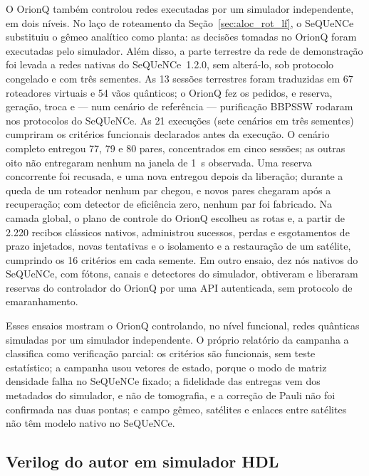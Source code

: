 \documentclass[12pt]{article}
\begin{document}
O OrionQ também controlou redes executadas por um simulador independente, em dois
níveis. No laço de roteamento da Seção~\ref{sec:aloc_rot_lf}, o SeQUeNCe substituiu
o gêmeo analítico como planta: as decisões tomadas no OrionQ foram executadas
pelo simulador. Além disso, a parte terrestre da rede de demonstração foi levada
a redes nativas do SeQUeNCe~1.2.0, sem alterá-lo, sob protocolo congelado e com
três sementes. As 13 sessões terrestres foram traduzidas em 67 roteadores virtuais
e 54 vãos quânticos; o OrionQ fez os pedidos, e reserva, geração, troca e ---
num cenário de referência --- purificação BBPSSW rodaram nos protocolos do
SeQUeNCe. As 21 execuções (sete
cenários em três sementes) cumpriram os critérios funcionais declarados antes da
execução. O cenário completo entregou 77, 79 e 80 pares, concentrados em cinco
sessões; as outras oito não entregaram nenhum na janela de 1~s observada. Uma
reserva concorrente foi recusada, e uma nova entregou depois da liberação;
durante a queda de um roteador nenhum par chegou, e novos pares chegaram após a
recuperação; com detector de eficiência zero, nenhum par foi fabricado. Na camada
global, o plano de controle do OrionQ escolheu as rotas e, a partir de 2.220
recibos clássicos nativos, administrou sucessos, perdas e esgotamentos de prazo
injetados, novas tentativas e o isolamento e a restauração de um satélite,
cumprindo os 16 critérios em cada semente. Em outro ensaio, dez nós nativos do
SeQUeNCe, com fótons, canais e detectores do simulador, obtiveram e liberaram
reservas do controlador do OrionQ por uma API autenticada, sem protocolo de
emaranhamento.

Esses ensaios mostram o OrionQ controlando, no nível funcional, redes quânticas
simuladas por um simulador independente. O próprio relatório da campanha a
classifica como verificação parcial: os critérios são funcionais, sem teste
estatístico; a campanha usou vetores de estado, porque o modo de matriz
densidade falha no SeQUeNCe fixado; a fidelidade das entregas vem dos metadados
do simulador, e não de tomografia, e a correção de Pauli não foi confirmada nas
duas pontas; e campo gêmeo, satélites e enlaces entre satélites não têm modelo
nativo no SeQUeNCe.

\subsection{Verilog do autor em simulador HDL}
\label{sec:rtl}
\end{document}
